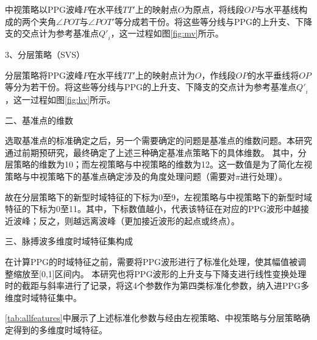 中视策略以PPG波峰$P$在水平线$TT'$上的映射点$O$为原点，将线段$OP$与水平基线构成的两个夹角$\angle POT$与$\angle POT'$等分成若干份。将这些等分线与PPG的上升支、下降支的交点计为参考基准点${Q'}_i$，这一过程如图\autoref{fig:mv}所示。

3、分层策略（SVS）

分层策略将PPG波峰$P$在水平线$TT'$上的映射点计为$O$，作线段$OP$的水平垂线将$OP$等分为若干份。将这些等分线与PPG的上升支、下降支的交点计为参考基准点${Q'}_i$，这一过程如图\autoref{fig:hv}所示。

二、基准点的维数

选取基准点的标准确定之后，另一个需要确定的问题是基准点的维数问题。本研究通过前期预研究，最终确定了上述三种确定基准点策略下的具体维数。
其中，分层策略的维数为10；而左视策略与中视策略的维数为12。这一数值是为了简化左视策略与中视策略下的基准点确定涉及的角度处理问题（需要对$\pi$进行处理）。

故在分层策略下的新型时域特征的下标为0至9，左视策略与中视策略下的新型时域特征的下标为0至11。其中，下标数值越小，代表该特征在对应的PPG波形中越接近波峰；反之，则越远离波峰（更加接近波形的起点或终点）。

三、脉搏波多维度时域特征集构成

在计算PPG的时域特征之前，需要将PPG波形进行了标准化处理，使其幅值被调整缩放至[0,1]区间内。
本研究也将PPG波形的上升支与下降支进行线性变换处理时的截距与斜率进行了记录，将这4个参数作为第四类标准化参数，纳入进PPG多维度时域特征集中。

\autoref{tab:allfeatures}中展示了上述标准化参数与经由左视策略、中视策略与分层策略确定得到的多维度时域特征。

